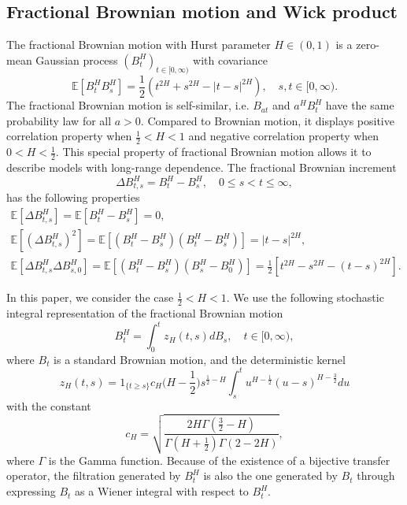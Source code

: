 \documentclass[10pt,a4paper]{amsart}
\numberwithin{equation}{section}
\begin{document}
\subsection{Fractional Brownian motion and Wick product}
The fractional Brownian motion with Hurst parameter $H\in\left( 0,1\right) $ is 
a zero-mean Gaussian process $\left ( B_{t}^{H} \right )_{t \in [0,\infty)} $ with
 covariance
\[
\mathbb{E}\left[B_{t}^{H} B_{s}^{H}\right]=\frac{1}{2}\left(t^{2 H}+s^{2 H}
-|t-s|^{2 H}\right), \quad s,t \in [0,\infty).
\]
The fractional Brownian motion is self-similar, i.e. $ B_{at} $ and 
$a^{H} B_{t}^{H}$ have the same probability law for all $a>0$. Compared to 
Brownian motion, it displays positive correlation property when $\frac{1}{2}<H<1$
and negative correlation property when $0<H<\frac{1}{2}$. This special property 
of fractional Brownian motion allows it to describe models with long-range dependence. The fractional Brownian increment
\[
 \Delta B_{t, s}^H=B_t^H-B_s^H, \quad 0\leq s<t \leq\infty,
\]
has the following properties
\begin{gather*}
\mathbb{E}\left[\Delta B_{t, s}^H\right]
=\mathbb{E}\left[B_t^H-B_s^H\right]=0,\\
\mathbb{E}\left[\left(\Delta B_{t, s}^H\right)^2\right]
=\mathbb{E}\left[\left(B_t^H-B_s^H\right)\left(B_t^H-B_s^H\right)\right]=|t-s|^{2 H} ,\\
\mathbb{E}\left[\Delta B_{t, s}^H \Delta B_{s, 0}^H\right]
=\mathbb{E}\left[\left(B_t^H-B_s^H\right)\left(B_s^H-B_0^H\right)\right] =\frac{1}{2}\left[t^{2 H}-s^{2 H}-(t-s)^{2 H}\right] .
\end{gather*}

In this paper, we consider the case $\frac{1}{2}<H<1$. We use the following 
stochastic integral representation of the fractional Brownian motion
\[
B_t^H=\int_0^t z_H(t, s) d B_s, \quad t \in [0,\infty),
\]
where $B_{t} $ is a standard Brownian motion, and the deterministic kernel
\[
 z_H(t, s)=1_{\{t \geq s\}} c_H\big(H-\frac{1}{2}\big) s^{\frac{1}{2}-H} 
 \int_s^t u^{H-\frac{1}{2}}(u-s)^{H-\frac{3}{2}} d u
\]
with the constant
\[
c_H=\sqrt{\frac{2 H \Gamma\left(\frac{3}{2}-H\right)}{\Gamma\left(H+\frac{1}{2}\right) 
\Gamma(2-2 H)}} ,
\]
where $\Gamma$ is the Gamma function. Because of the existence of a bijective transfer 
operator, the filtration generated by $B_{t}^{H}$ is also the one generated by 
$B_{t}$ through expressing $B_{t}$ as a Wiener integral with respect to $B_{t}^{H}$.
\end{document}
